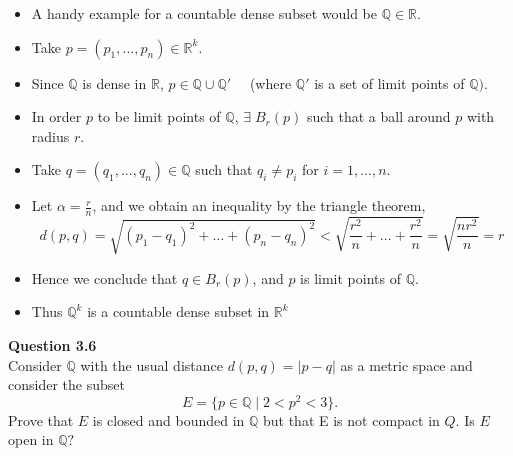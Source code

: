 \documentclass[12pt]{article}
\begin{document}
 \begin{itemize}
     \item A handy example for a countable dense subset would be $\mathbb{Q} \in \mathbb{R}.$
     \item Take $p = (p_1, ... , p_n) \in \mathbb{R}^k.$ 
     \item Since $\mathbb{Q}$ is dense in $\mathbb{R}$, $p\in \mathbb{Q} \cup \mathbb{Q}' \quad$ (where $\mathbb{Q}'$ is a set of limit points of $\mathbb{Q}).$\\
     
     \item In order $p$ to be limit points of $\mathbb{Q}$, $\exists\; B_r(p)$ such that  a ball around $p$ with radius $r$.
     \item Take $q = (q_1, ... , q_n) \in \mathbb{Q}$ such that $q_i \neq p_i$ for $i = 1,...,n$.
     \item Let $\alpha = \frac{r}{n}$, and we obtain an inequality by the triangle theorem, $$d(p,q) = \sqrt{(p_1 - q_1)^2 + \dots + (p_n - q_n)^2} < \sqrt{\frac{r^2}{n} + ... + \frac{r^2}{n}} = \sqrt{\frac{nr^2}{n}} = r$$
     \item Hence we conclude that $q \in B_r(p)$, and $p$ is limit points of $\mathbb{Q}$.
     \item Thus $\mathbb{Q}^k$ is a countable dense subset in $\mathbb{R}^k$
 \end{itemize}

 
 \newpage
 \noindent
 \textbf{Question 3.6}\\
 Consider $\mathbb{Q}$ with the usual distance $d(p,q) = |p - q|$ as a metric space and consider the subset $$E = \{p\in \mathbb{Q}\;|\;2 < p^2 < 3\}.$$
 Prove that $E$ is closed and bounded in $\mathbb{Q}$ but that E is not compact in $Q$. Is $E$ open in $\mathbb{Q}?$
  
\end{document}
